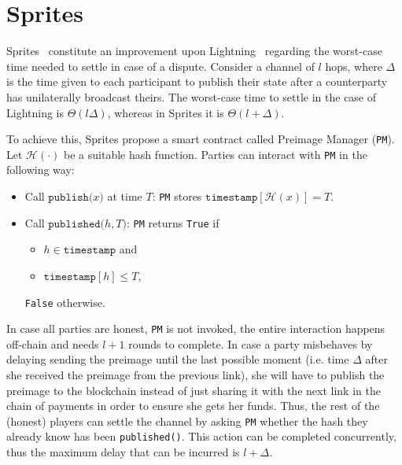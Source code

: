 \section{Sprites}
  Sprites~\cite{sprites} constitute an improvement upon Lightning~\cite{lightning}
  regarding the worst-case time needed to settle in case of a dispute. Consider a channel
  of $l$ hops, where $\Delta$ is the time given to each participant to publish their state
  after a counterparty has unilaterally broadcast theirs. The worst-case time to settle in
  the case of Lightning is $\Theta\left(l\Delta\right)$, whereas in Sprites it is
  $\Theta\left(l + \Delta\right)$.

  To achieve this, Sprites propose a smart contract called Preimage Manager (\texttt{PM}).
  Let $\mathcal{H}\left(\cdot\right)$ be a suitable hash function. Parties can interact
  with \texttt{PM} in the following way:
  \begin{itemize}
    \item Call $\mathtt{publish(}x\mathtt{)}$ at time $T$: \texttt{PM} stores
    $\mathtt{timestamp}\left[\mathcal{H}\left(x\right)\right] = T$.
    \item Call $\mathtt{published(}h, T\mathtt{)}$: \texttt{PM} returns \texttt{True} if
    \begin{itemize}
      \item $h \in \mathtt{timestamp}$ and
      \item $\mathtt{timestamp}\left[h\right] \leq T$,
    \end{itemize}
    \texttt{False} otherwise.
  \end{itemize}

  In case all parties are honest, \texttt{PM} is not invoked, the entire interaction
  happens off-chain and needs $l + 1$ rounds to complete. In case a party misbehaves by
  delaying sending the preimage until the last possible moment (i.e. time $\Delta$ after
  she received the preimage from the previous link), she will have to publish the preimage
  to the blockchain instead of just sharing it with the next link in the chain of
  payments in order to ensure she gets her funds. Thus, the rest of the (honest) players
  can settle the channel by asking \texttt{PM} whether the hash they already know has been
  \texttt{published()}. This action can be completed concurrently, thus the maximum delay
  that can be incurred is $l + \Delta$.
